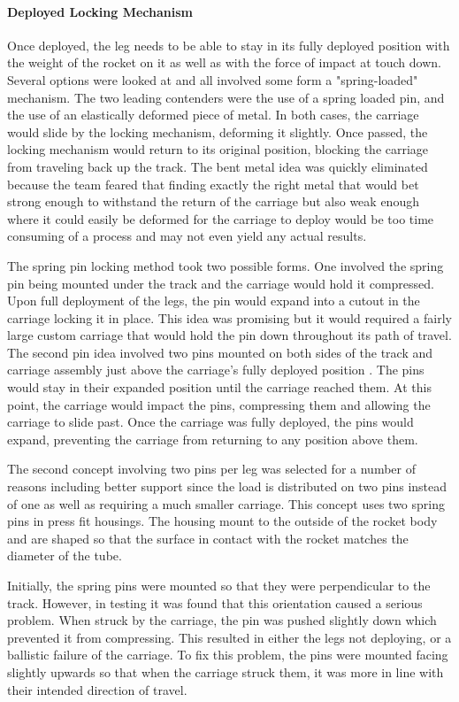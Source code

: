 \paragraph{Deployed Locking Mechanism}
\label{legdeployedlockingmechanism}
Once deployed, the leg needs to be able to stay in its fully deployed position with the weight of the rocket on it as well as with the force of impact at touch down. Several options were looked at and all involved some form a "spring-loaded" mechanism. The two leading contenders were the use of a spring loaded pin, and the use of an elastically deformed piece of metal. In both cases, the carriage would slide by the locking mechanism, deforming it slightly. Once passed, the locking mechanism would return to its original position, blocking the carriage from traveling back up the track. The bent metal idea was quickly eliminated because the team feared that finding exactly the right metal that would bet strong enough to withstand the return of the carriage but also weak enough where it could easily be deformed for the carriage to deploy would be too time consuming of a process and may not even yield any actual results.

The spring pin locking method took two possible forms. One involved the spring pin being mounted under the track and the carriage would hold it compressed. Upon full deployment of the legs, the pin would expand into a cutout in the carriage locking it in place. This idea was promising but it would required a fairly large custom carriage that would hold the pin down throughout its path of travel. The second pin idea involved two pins mounted on both sides of the track and carriage assembly just above the carriage's fully deployed position . The pins would stay in their expanded position until the carriage reached them. At this point, the carriage would impact the pins, compressing them and allowing the carriage to slide past. Once the carriage was fully deployed, the pins would expand, preventing the carriage from returning to any position above them. 

The second concept involving two pins per leg was selected for a number of reasons including better support since the load is distributed on two pins instead of one as well as requiring a much smaller carriage. This concept uses two spring pins in press fit housings. The housing mount to the outside of the rocket body and are shaped so that the surface in contact with the rocket matches the diameter of the tube.

Initially, the spring pins were mounted so that they were perpendicular to the track. However, in testing it was found that this orientation caused a serious problem. When struck by the carriage, the pin was pushed slightly down which prevented it from compressing. This resulted in either the legs not deploying, or a ballistic failure of the carriage. To fix this problem, the pins were mounted facing slightly upwards so that when the carriage struck them, it was more in line with their intended direction of travel. 

